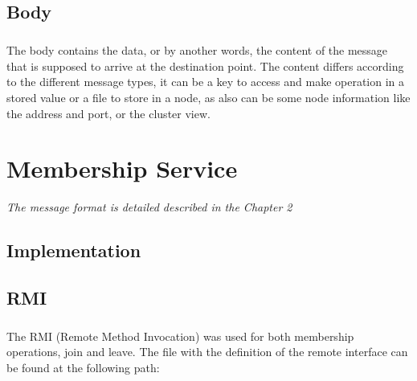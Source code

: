 \documentclass{report}
\begin{document}
			\section{Body}
	
				\paragraph{} The body contains the data, or by another words, the
				content of the message that is supposed to arrive at the destination point.
				The content differs according to the different message types, it
				can be a key to access and make operation in a stored value or a
				file to store in a node, as also can be some node information like the address
				and port, or the cluster view.

	\chapter{Membership Service}
			\emph{The message format is detailed described in the Chapter 2}

	        \paragraph{}
	        
	        \paragraph{}

			\section{Implementation}
	
				\paragraph{}
				
				\paragraph{}

			\section{RMI}
				\paragraph{} The RMI (Remote Method Invocation) was used for both
				membership operations, join and leave. The file with the definition 
				of the remote interface can be found at the following path:
\end{document}
